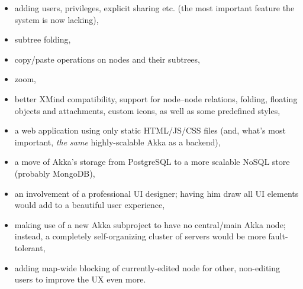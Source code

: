 \begin{itemize}
	\item adding users, privileges, explicit sharing etc. (the most important feature the system is now lacking),
	\item subtree folding,
	\item copy/paste operations on nodes and their subtrees,
	\item zoom,
	\item better XMind compatibility, support for node--node relations, folding, floating objects and attachments, custom icons, as well as some predefined styles,
	\item a web application using only static HTML/JS/CSS files (and, what's most important, \emph{the same} highly-scalable Akka as a backend),
	\item a move of Akka's storage from PostgreSQL to a more scalable NoSQL store (probably MongoDB),
	\item an involvement of a professional UI designer; having him draw all UI elements would add to a beautiful user experience,
	\item making use of a new  Akka subproject to have no central/main Akka node; instead, a completely self-organizing cluster of servers would be more fault-tolerant,
	\item adding map-wide blocking of currently-edited node for other, non-editing users to improve the UX even more.
\end{itemize}
